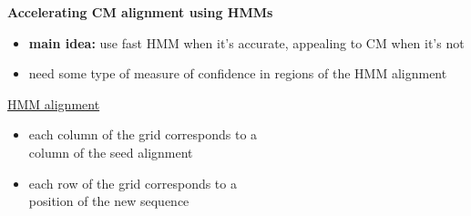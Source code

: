 \documentclass[landscape]{slides}
\begin{document}
\begin{slide}
\begin{center}
\large
\textbf{Accelerating CM alignment using HMMs}
\end{center}
\medskip
\begin{minipage}{6in}
\footnotesize
\begin{itemize}
\item
\textbf{main idea:} use fast HMM when it's accurate, appealing to CM when it's not
\item
need some type of measure of confidence in regions of the HMM alignment

\end{itemize}
\small
\hspace{0.3in}
\underline{HMM alignment}%
\begin{itemize}
\item
each column of the grid corresponds to a \\ column
of the seed alignment
\item
each row of the grid corresponds to a \\ position of the new sequence
\end{itemize}
\vspace{3in}
\end{minipage}
\begin{minipage}{4in}
\begin{center}

\end{center}
\end{minipage}
\end{slide}
\end{document}
